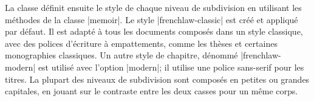 \begin{noprint}
\newcommand{\heading}[2][]{
	\begingroup
		\if@article\else\cleardoublepage\fi
		\stepcounter{heading}
		\renewcommand{\printchaptertitle}{%
			\printheadingname%
			\headingnamenum\printheadingnum%
			\afterheadingnum%
			\printheadingtitle%
		}
		\clearforchapter
		\thispagestyle{chapter}
		\@schapter{#2}
		\chaptermark{#2}
		\phantomsection
		\addcontentsline{toc}{heading}{\protect\numberline{\theheading}#2}
	\endgroup
}
\end{noprint}

\begin{noprint}
\newcommand{\subheading}[2][]{
	\begingroup
		\if@article\else\cleardoublepage\fi
		\stepcounter{subheading}
		\renewcommand{\printchaptertitle}{%
			\printsubheadingname%
			\subheadingnamenum\printsubheadingnum%
			\aftersubheadingnum%
			\printsubheadingtitle%
		}
		\clearforchapter
		\thispagestyle{chapter}
		\@schapter{#2}
		\chaptermark{#2}
		\phantomsection
		\addcontentsline{toc}{subheading}{\protect\numberline{\thesubheading}#2}
	\endgroup
}
\end{noprint}

La classe \frenchlaw définit ensuite le style de chaque niveau de subdivision en utilisant les méthodes de la classe |memoir|. Le style |frenchlaw-classic| est créé et appliqué par défaut. Il est adapté à tous les documents composés dans un style classique, avec des polices d'écriture à empattements, comme les thèses et certaines monographies classiques. Un autre style de chapitre, dénommé |frenchlaw-modern| est utilisé avec l'option |modern|; il utilise une police sans-serif pour les titres. La plupart des niveaux de subdivision sont composés en petites ou grandes capitales, en jouant sur le contraste entre les deux casses pour un même corps.


